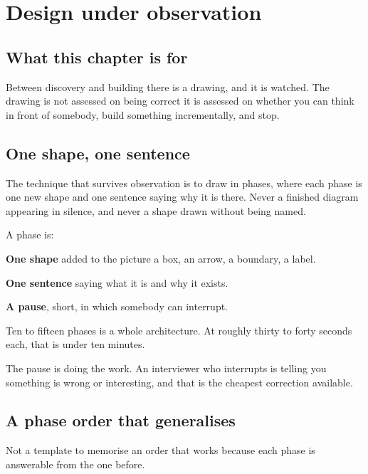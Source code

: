 \chapter{Design under observation}
\label{ch:design}

\section*{What this chapter is for}

Between discovery and building there is a drawing, and it is watched. The
drawing is not assessed on being correct \dash{} it is assessed on whether you
can think in front of somebody, build something incrementally, and stop.

\section{One shape, one sentence}

The technique that survives observation is to draw in phases, where each phase
is one new shape and one sentence saying why it is there. Never a finished
diagram appearing in silence, and never a shape drawn without being named.

\begin{kitmethod}
A phase is:

\textbf{One shape} added to the picture \dash{} a box, an arrow, a boundary,
a label.

\textbf{One sentence} saying what it is and why it exists.

\textbf{A pause}, short, in which somebody can interrupt.

Ten to fifteen phases is a whole architecture. At roughly thirty to forty
seconds each, that is under ten minutes.
\end{kitmethod}

The pause is doing the work. An interviewer who interrupts is telling you
something is wrong or interesting, and that is the cheapest correction
available. 

\section{A phase order that generalises}

Not a template to memorise \dash{} an order that works because each phase is
answerable from the one before.

